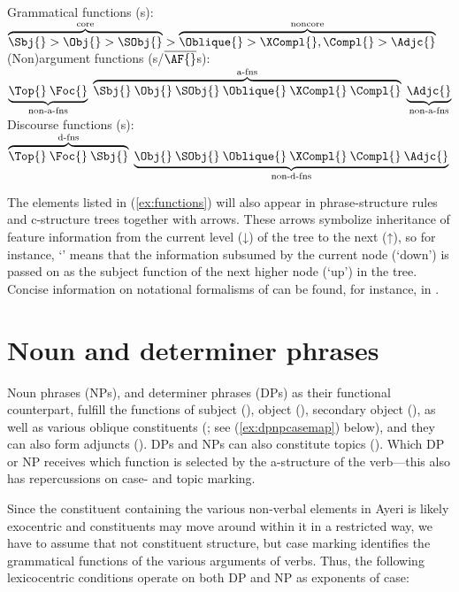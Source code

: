\pex\label{ex:functions}
\a\label{ex:gfs} Grammatical functions (\GF{}s):\\
	$\overbrace{\Sbj{} > \Obj{} > \SObj{}}^{\text{core}} > 
	\overbrace{\Oblique{} > \XCompl{}, \Compl{} > \Adjc{}}^{\text{noncore}}$
\a\label{ex:nonafs} (Non)argument functions (\AF{}s/$\overline{\mbox{\AF{}}%
}$s):\\
	$\underbrace{\Top{}\: \Foc{}}_{\text{non-a-fns}}\; 
	\overbrace{\Sbj{}\: \Obj{}\: \SObj{}\: \Oblique{}\: \XCompl{}\: 
		\Compl{}}^{\text{a-fns}}\; 
	\underbrace{\Adjc{}}_{\text{non-a-fns}}$
\a\label{ex:dfs} Discourse functions (\DF{}s):\\
	$\overbrace{\Top{}\: \Foc{}\: \Sbj{}}^{\text{d-fns}}\;
	\underbrace{\Obj{}\: \SObj{}\: \Oblique{}\: \XCompl{}\: \Compl{}\: 
		\Adjc{}}_{\text{non-d-fns}}$
\xe

The elements listed in (\ref{ex:functions}) will also appear in
phrase-structure rules and c-structure trees together with arrows. These arrows
symbolize inheritance of feature information from the current level (↓) of the
tree to the next (↑), so for instance, `\pass{\Sbj}' means that the information
subsumed by the current node (`down') is passed on as the subject function of
the next higher node (`up') in the tree. Concise information on notational
formalisms of \Lfg{} can be found, for instance, in \citet{buttking2015}.

\section{Noun and determiner phrases}
\label{sec:nps-dps}

Noun phrases (NPs), and determiner phrases (DPs) as their functional 
counterpart, fulfill the functions of subject (\Sbj{}), object (\Obj{}), 
secondary object (\SObj{}), as well as various oblique constituents (\Oblique;
see (\ref{ex:dpnpcasemap}) below), and they can also form adjuncts (\Adjc{}).
DPs and NPs can also constitute topics (\Top{}). Which DP or NP receives which 
function is selected by the a-structure of the verb---this also has 
repercussions on case- and topic marking.

Since the constituent containing the various non-verbal elements in Ayeri is 
likely exocentric and constituents may move around within it in a restricted 
way, we have to assume that not constituent structure, but case marking 
identifies the grammatical functions of the various arguments of verbs. Thus, 
the following lexicocentric conditions operate on both DP and NP as exponents 
of case:

